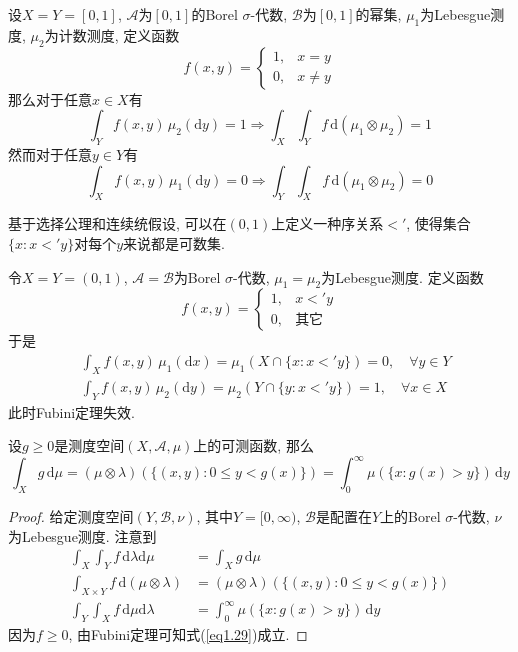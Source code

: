 \documentclass[cn, 12pt, math=mtpro2, bibstyle=apa, blue, twocol]{elegantbook}
\begin{document}
\begin{example}
设$X=Y=[0,1]$, $\mathcal{A}$为$[0,1]$的Borel $\sigma$-代数, $\mathcal{B}$为$[0,1]$的幂集, $\mu_1$为Lebesgue测度, $\mu_2$为计数测度, 定义函数
$$f(x,y)=\begin{cases}
           1, & x=y \\
           0, & x\neq y
         \end{cases}$$
那么对于任意$x\in X$有
$$\int_{Y}f(x,y)\,\mu_2(\text{d}y)=1\Rightarrow \int_{X}\int_{Y}f\,\text{d}(\mu_1\otimes\mu_2)=1$$
然而对于任意$y\in Y$有
$$\int_{X}f(x,y)\,\mu_1(\text{d}y)=0\Rightarrow\int_{Y}\int_{X}f\,\text{d}(\mu_1\otimes\mu_2)=0 $$
\end{example}

 \begin{example}
  基于选择公理和连续统假设, 可以在$(0,1)$上定义一种序关系$<'$, 使得集合$\{x:x<'y\}$对每个$y$来说都是可数集.

  令$X=Y=(0,1)$, $\mathcal{A}=\mathcal{B}$为Borel $\sigma$-代数, $\mu_1=\mu_2$为Lebesgue测度. 定义函数
  $$f(x,y)=\begin{cases}
             1, & x<'y \\
             0, & \text{其它}
           \end{cases}$$
  于是
  \begin{align*}
  &\int_Xf(x,y)\,\mu_1(\text{d}x)=\mu_1(X\cap \{x:x<'y\})=0,\quad \forall y\in Y \\
  &\int_Yf(x,y)\,\mu_2(\text{d}y)=\mu_2(Y\cap \{y:x<'y\})=1,\quad \forall x\in X
  \end{align*}
  此时Fubini定理失效.
 \end{example}

\begin{example}
设$g\ge0$是测度空间$(X,\mathcal{A},\mu)$上的可测函数, 那么
\begin{equation}\label{eq1.29}
  \int_Xg\,\text{d}\mu=(\mu\otimes\lambda)(\{(x,y):0\leq y<g(x)\})=\int_{0}^{\infty}\mu(\{x:g(x)>y\})\,\text{d}y
\end{equation}
\end{example}
\begin{proof}
  给定测度空间$(Y,\mathcal{B},\nu)$, 其中$Y=[0,\infty)$, $\mathcal{B}$是配置在$Y$上的Borel $\sigma$-代数, $\nu$为Lebesgue测度. 注意到
  \begin{align*}
  \int_{X}\int_{Y}f\,\text{d}\lambda\text{d}\mu&=\int_Xg\,\text{d}\mu \\
  \int_{X\times Y}f\,\text{d}(\mu\otimes\lambda)&=(\mu\otimes\lambda)(\{(x,y):0\leq y<g(x)\}) \\
  \int_Y\int_Xf\,\text{d}\mu\text{d}\lambda&=\int_{0}^{\infty}\mu(\{x:g(x)>y\})\,\text{d}y
  \end{align*}
  因为$f\ge0$, 由Fubini定理可知式(\ref{eq1.29})成立.

\end{proof}
\end{document}
